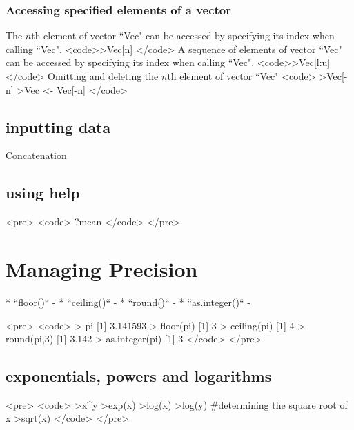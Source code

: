 \subsubsection{Accessing specified elements of a vector}

The $n$th element of vector ``Vec" can be accessed by specifying its index when
calling ``Vec".
<code>>Vec[n]
</code>
A sequence of  elements of vector ``Vec" can be accessed by specifying its index
when calling ``Vec".
<code>>Vec[l:u]
</code>
Omitting and deleting the $n$th element of vector ``Vec"
<code>
>Vec[-n]
>Vec <- Vec[-n]
</code>



\subsection{inputting data}
Concatenation

\subsection{using help}

<pre>
<code>
?mean
</code>
</pre>



\newpage
\section{Managing Precision}
\begin{itemize}
*  ``floor()`` - 
*  ``ceiling()`` - 
*  ``round()`` - 
*  ``as.integer()`` -
\end{itemize}

<pre>
<code>
> pi
[1] 3.141593
> floor(pi)
[1] 3
> ceiling(pi)
[1] 4
> round(pi,3)
[1] 3.142
> as.integer(pi)
[1] 3
</code>
</pre>

\subsection{exponentials, powers and logarithms}

<pre>
<code>
>x^y
>exp(x)
>log(x)
>log(y)
#determining the square root of x
>sqrt(x)
</code>
</pre>

